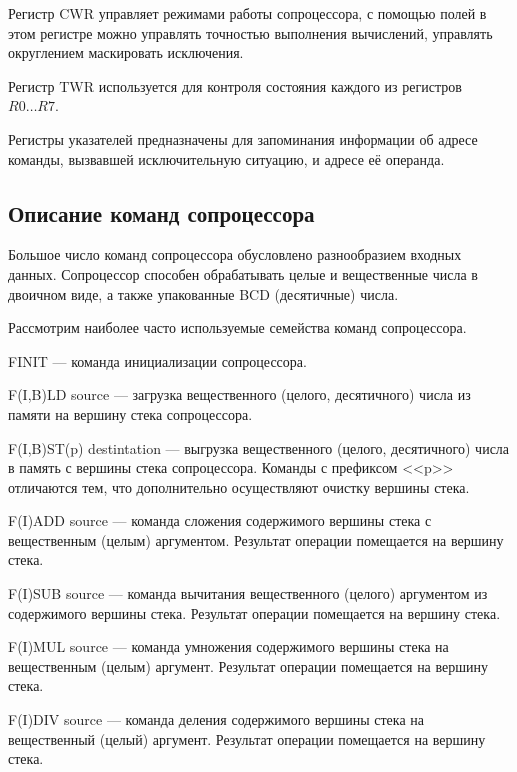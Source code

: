 Регистр CWR управляет режимами работы сопроцессора, с помощью полей в этом регистре
можно управлять точностью выполнения вычислений, управлять округлением маскировать исключения.

Регистр TWR используется для контроля состояния каждого из регистров $R0 \dots R7$.

Регистры указателей предназначены для запоминания информации об адресе команды, вызвавшей 
исключительную ситуацию, и адресе её операнда.

\subsection{Описание команд сопроцессора}

Большое число команд сопроцессора обусловлено разнообразием входных данных.
Сопроцессор способен обрабатывать целые и вещественные числа в двоичном виде,
а также упакованные BCD (десятичные) числа.

Рассмотрим наиболее часто используемые семейства команд сопроцессора.

FINIT --- команда инициализации сопроцессора.

F(I,B)LD source --- загрузка вещественного (целого, десятичного) 
числа из памяти на вершину стека сопроцессора.

F(I,B)ST(p) destintation --- выгрузка вещественного (целого, десятичного) 
числа в память с вершины стека сопроцессора. Команды с префиксом <<p>>
отличаются тем, что дополнительно осуществляют очистку вершины стека.

F(I)ADD source --- команда сложения содержимого вершины стека с вещественным (целым)
аргументом. Результат операции помещается на вершину стека.

F(I)SUB source --- команда вычитания вещественного (целого)
аргументом из содержимого вершины стека. Результат операции помещается на вершину стека.

F(I)MUL source --- команда умножения содержимого вершины стека на вещественным (целым)
аргумент. Результат операции помещается на вершину стека.

F(I)DIV source --- команда деления содержимого вершины стека на вещественный (целый)
аргумент. Результат операции помещается на вершину стека.